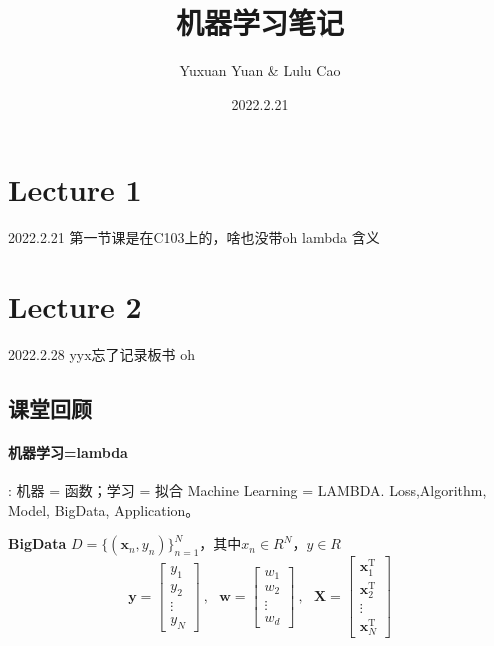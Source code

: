 \documentclass[UTF8]{ctexart}
\title{机器学习笔记}
\author{Yuxuan Yuan \& Lulu Cao}
\date{2022.2.21}
\begin{document}
\maketitle

\newpage
\tableofcontents

\newpage

\section{Lecture 1}
2022.2.21
第一节课是在C103上的，啥也没带oh
lambda 含义


\newpage
\section{Lecture 2}
2022.2.28
yyx忘了记录板书 oh

\subsection{课堂回顾}
\paragraph{机器学习=lambda} 
 : 机器 = 函数；学习 = 拟合 \newline   
Machine Learning = LAMBDA. Loss,Algorithm, Model, BigData, Application。

\textbf{BigData} $D=\{( \boldsymbol{x}_{n},y_n)\}_{n=1}^{N}$，其中$x_n \in R^N$，$y\in R$
\begin{equation*}
    \boldsymbol{y}=\left[\begin{array}{l}
                            y_{1} \\
                            y_{2} \\
                            \vdots \\
                            y_{N}
                        \end{array}\right]
        \ ,  \ \ \
    \boldsymbol{w}=\left[\begin{array}{l}
                            w_{1} \\
                            w_{2} \\
                            \vdots \\
                            w_{d}
                        \end{array}\right]
        \ ,  \ \ \
    \boldsymbol{X}=\left[\begin{array}{c}
                            \boldsymbol{x}_{1}^{\mathrm{T}} \\
                            \boldsymbol{x}_{2}^{\mathrm{T}} \\
                            \vdots \\
                            \boldsymbol{x}_{N}^{\mathrm{T}}
                        \end{array}\right]
\end{equation*}
\end{document}
